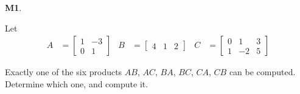 \documentclass{article}
\newenvironment{problem}[1]
{
  \begin{flushleft}
  \textbf{#1}.
  \ignorespaces
}
{
  \end{flushleft}
}
\begin{document}
\begin{problem}{M1}
Let
\begin{align*}
A &= \begin{bmatrix} 1 & -3 \\ 0 & 1 \end{bmatrix} & B&= \begin{bmatrix} 4 & 1 & 2 \end{bmatrix} & C&= \begin{bmatrix} 0 & 1 & 3 \\ 1 & -2 & 5 \end{bmatrix}
\end{align*}

Exactly one of the six products $AB$, $AC$, $BA$, $BC$, $CA$, $CB$ can be computed.  Determine which one, and compute it.
\end{problem}
\end{document}
